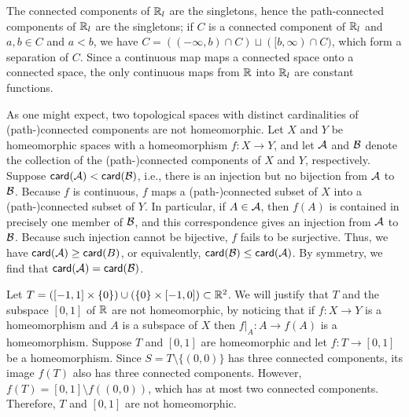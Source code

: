 \begin{exmp}
    The connected components of ${\mathbb{R}}_l$ are the singletons, hence the path-connected components of ${\mathbb{R}}_l$ are the singletons; if $C$ is a connected component of ${\mathbb{R}}_l$ and $a, b\in C$ and $a<b$, we have $C=((-\infty, b)\cap C)\sqcup([b, \infty)\cap C)$, which form a separation of $C$.
    Since a continuous map maps a connected space onto a connected space, the only continuous maps from ${\mathbb{R}}$ into ${\mathbb{R}}_l$ are constant functions.
\end{exmp}
\begin{obs}
    As one might expect, two topological spaces with distinct cardinalities of (path-)connected components are not homeomorphic.
    Let $X$ and $Y$ be homeomorphic spaces with a homeomorphism $f: X\rightarrow Y$, and let ${\mathcal{A}}$ and ${\mathcal{B}}$ denote the collection of the (path-)connected components of $X$ and $Y$, respectively.
    Suppose $\textsf{card}({{\mathcal{A}}})<\textsf{card}({{\mathcal{B}}})$, i.e., there is an injection but no bijection from ${\mathcal{A}}$ to ${\mathcal{B}}$.
    Because $f$ is continuous, $f$ maps a (path-)connected subset of $X$ into a (path-)connected subset of $Y$.
    In particular, if $A\in{\mathcal{A}}$, then $f(A)$ is contained in precisely one member of ${\mathcal{B}}$, and this correspondence gives an injection from ${\mathcal{A}}$ to ${\mathcal{B}}$.
    Because such injection cannot be bijective, $f$ fails to be surjective.
    Thus, we have $\textsf{card}({{\mathcal{A}}})\geq\textsf{card}({B})$, or equivalently, $\textsf{card}({{\mathcal{B}}})\leq\textsf{card}({{\mathcal{A}}})$.
    By symmetry, we find that $\textsf{card}({{\mathcal{A}}})=\textsf{card}({{\mathcal{B}}})$.
\end{obs}
\begin{exmp}
    Let $T=([-1, 1]\times\{0\})\cup(\{0\}\times[-1, 0])\subset {\mathbb{R}}^2$.
    We will justify that $T$ and the subspace $[0, 1]$ of ${\mathbb{R}}$ are not homeomorphic, by noticing that if $f: X\rightarrow Y$ is a homeomorphism and $A$ is a subspace of $X$ then $f|_A: A\rightarrow f(A)$ is a homeomorphism.
    Suppose $T$ and $[0, 1]$ are homeomorphic and let $f: T\rightarrow [0, 1]$ be a homeomorphism.
    Since $S=T\setminus\{(0, 0)\}$ has three connected components, its image $f(T)$ also has three connected components.
    However, $f(T)=[0, 1]\setminus f((0, 0))$, which has at most two connected components.
    Therefore, $T$ and $[0, 1]$ are not homeomorphic.
\end{exmp}
